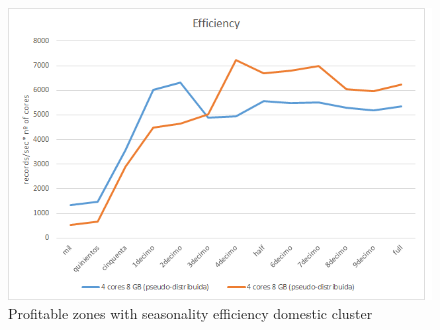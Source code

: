 \begin{figure}[htp!]
	\centering
	\caption{Profitable zones with seasonality efficiency domestic cluster}
	\label{epdd}
	\vspace{5pt}
	\includegraphics[scale=0.85]{geng/epdd}
\end{figure}

